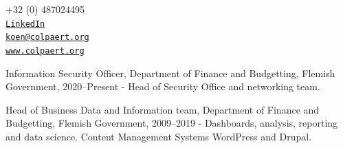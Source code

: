 \documentclass[11pt,article,oneside]{memoir}
\makeatletter
\def\myemail{koen@colpaert.org}
\def\myweb{www.colpaert.org}
\def\myphone{+32 (0) 487024495}
\def\mytwitter{LinkedIn}
\makeatother
\begin{document}

\pagestyle{kjh}
\thispagestyle{kjhgit}


\begin{minipage}[t]{2.95in}
  
\end{minipage}
\hfill     
\hfill
\begin{minipage}[t]{1.3in}
  \flushright \footnotesize  \addressblock \myphone \, \faPhone \\ 
  {\scriptsize  \texttt{\href{https://www.linkedin.com/in/koencolpaert/}{\mytwitter}} \, \faGlobe }  \\ 
  {\scriptsize  \texttt{\href{mailto:\myemail}{\myemail}} \, \faEnvelope} \\
  {\scriptsize  \texttt{\href{\myweb}{\myweb}} \, \faGlobe}
\end{minipage}

\medskip

\reversemarginpar

\bigskip       

{}

\ind Information Security Officer, Department of Finance and Budgetting, Flemish Government, 2020--Present - Head of Security Office and networking team.      

\ind Head of Business Data and Information team, Department of Finance and Budgetting, Flemish Government, 2009--2019 - Dashboards, analysis, reporting and data science. Content Management Systems WordPress and Drupal.
\end{document}
